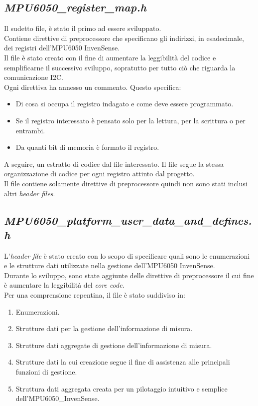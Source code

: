 \documentclass[11pt]{report}
\begin{document}
\subsection{\textit{MPU6050\_register\_map.h}}
Il sudetto file, è stato il primo ad essere sviluppato.\\
Contiene direttive di preprocessore che specificano gli indirizzi, in esadecimale, dei registri dell'MPU6050 InvenSense.\\
Il file è stato creato con il fine di aumentare la leggibilità del codice e semplificarne il successivo sviluppo, sopratutto per tutto ciò che riguarda la comunicazione I2C.\\
Ogni direttiva ha annesso un commento. Questo specifica:
\begin{itemize}
\item Di cosa si occupa il registro indagato e come deve essere programmato.
\item Se il registro interessato è pensato solo per la lettura, per la scrittura o per entrambi.
\item Da quanti bit di memoria è formato il registro.
\end{itemize}
A seguire, un estratto di codice dal file interessato. Il file segue la stessa organizzazione di codice per ogni registro attinto dal progetto.\\

Il file contiene solamente direttive di preprocessore quindi non sono stati inclusi altri \textit{header files}.

\subsection{\textit{MPU6050\_platform\_user\_data\_and\_defines.h}}
L'\textit{header file} è stato creato con lo scopo di specificare quali sono le enumerazioni e le strutture dati utilizzate nella gestione dell'MPU6050 InvenSense.\\
Durante lo sviluppo, sono state aggiunte delle direttive di preprocessore il cui fine è aumentare la leggibilità del \textit{core code}.\\
Per una comprensione repentina, il file è stato suddiviso in:
\begin{enumerate}
    \item Enumerazioni.
    \item Strutture dati per la gestione dell'informazione di misura.
    \item Strutture dati aggregate di gestione dell'informazione di misura.
    \item Strutture dati la cui creazione segue il fine di assistenza alle principali funzioni di gestione.
    \item Struttura dati aggregata creata per un pilotaggio intuitivo e semplice\\dell'MPU6050\_InvenSense.
\end{enumerate}
\end{document}
